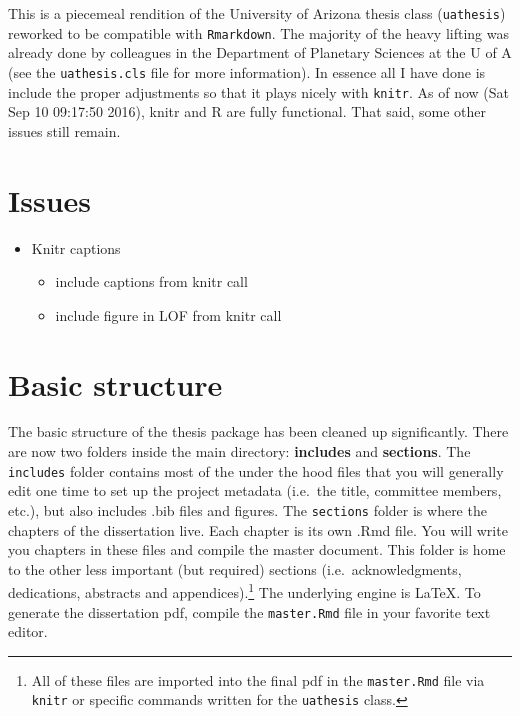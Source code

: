 \documentclass[11pt,report]{uncdissertation}
\providecommand{\tightlist}{%
  \setlength{\itemsep}{0pt}\setlength{\parskip}{0pt}}
\let\rmarkdownfootnote\footnote%
\def\footnote{\protect\rmarkdownfootnote}
\begin{document}
This is a piecemeal rendition of the University of Arizona thesis class
(\texttt{uathesis}) reworked to be compatible with \texttt{Rmarkdown}.
The majority of the heavy lifting was already done by colleagues in the
Department of Planetary Sciences at the U of A (see the
\texttt{uathesis.cls} file for more information). In essence all I have
done is include the proper adjustments so that it plays nicely with
\texttt{knitr}. As of now (Sat Sep 10 09:17:50 2016), knitr and R are
fully functional. That said, some other issues still remain.

\section{\texorpdfstring{Issues\label{issues}}{Issues}}\label{issues}

\begin{itemize}
\tightlist
\item
  Knitr captions

  \begin{itemize}
  \tightlist
  \item
    include captions from knitr call
  \item
    include figure in LOF from knitr call
  \end{itemize}
\end{itemize}

\section{Basic structure}\label{basic-structure}

The basic structure of the thesis package has been cleaned up
significantly. There are now two folders inside the main directory:
\textbf{includes} and \textbf{sections}. The \texttt{includes} folder
contains most of the under the hood files that you will generally edit
one time to set up the project metadata (i.e.~the title, committee
members, etc.), but also includes .bib files and figures. The
\texttt{sections} folder is where the chapters of the dissertation live.
Each chapter is its own .Rmd file. You will write you chapters in these
files and compile the master document. This folder is home to the other
less important (but required) sections (i.e.~acknowledgments,
dedications, abstracts and appendices).\footnote{All of these files are
  imported into the final pdf in the \texttt{master.Rmd} file via
  \texttt{knitr} or specific commands written for the \texttt{uathesis}
  class.} The underlying engine is \LaTeX. To generate the dissertation
pdf, compile the \texttt{master.Rmd} file in your favorite text editor.
\end{document}
